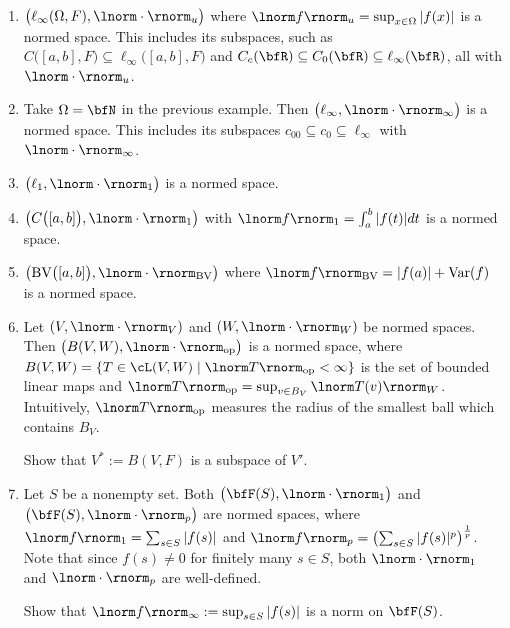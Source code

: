     \begin{center}
    \end{center}


    \begin{example}
        \phantom{a}
        \begin{enumerate}[label = (\arabic*),itemsep=1pt,topsep=3pt]
            \item $\bigl(\ell_\infty(\Omega,F), \lnorm \cdot \rnorm_u\bigr)$ where $\lnorm f \rnorm_u = \sup_{x \in \Omega}|f(x)|$ is a normed space. This includes its subspaces, such as $C \bigl([a,b],F\bigr) \subseteq \ell_\infty \bigl([a,b],F \bigr)$ and $C_c(\bfR) \subseteq C_0(\bfR) \subseteq \ell_\infty(\bfR)$, all with $\lnorm \cdot \rnorm_u$.
            \item Take $\Omega = \bfN$ in the previous example. Then $\bigl(\ell_\infty, \lnorm \cdot \rnorm_\infty\bigr)$ is a normed space. This includes its subspaces $c_{00} \subseteq c_0 \subseteq \ell_\infty$ with $\lnorm \cdot \rnorm_\infty$.
            \item $\bigl(\ell_1,\lnorm \cdot \rnorm_1\bigr)$ is a normed space.
            \item $\bigl(C\bigl([a,b]\bigr), \lnorm \cdot \rnorm_1\bigr)$ with $\lnorm f \rnorm_1 = \int_a^b |f(t)|dt$ is a normed space.
            \item $\bigl( \text{BV}\bigl([a,b]\bigr), \lnorm \cdot \rnorm_{\text{BV}}\bigr)$ where $\lnorm f \rnorm_{\text{BV}} = |f(a)| + \text{Var}(f)$ is a normed space.
            \item Let $(V,\lnorm \cdot \rnorm_V)$ and $(W,\lnorm \cdot \rnorm_W)$ be normed spaces. Then $\bigl(B(V,W),\lnorm \cdot \rnorm_\text{op}\bigr)$ is a normed space, where $B(V,W) = \{T \in \cL(V,W) \mid \lnorm T \rnorm_\text{op} < \infty\}$ is the set of bounded linear maps and $\lnorm T \rnorm_\text{op} = \sup_{v \in B_V}\lnorm T(v) \rnorm_W$. Intuitively, $\lnorm T \rnorm_\text{op}$ measures the radius of the smallest ball which contains $B_V$.
                \begin{exercise}
                    Show that $V^\ast := B(V,F)$ is a subspace of $V'$.
                \end{exercise}
            \item Let $S$ be a nonempty set. Both $\bigl( \bfF(S),\lnorm \cdot \rnorm_1\bigr)$ and $\bigl( \bfF(S),\lnorm \cdot \rnorm_p\bigr)$ are normed spaces, where $\lnorm f \rnorm_1 = \sum_{s \in S}|f(s)|$ and $\lnorm f \rnorm_p = \left( \sum_{s \in S}|f(s)|^p \right)^\frac{1}{p}$. Note that since $f(s) \neq 0$ for finitely many $s \in S$, both $\lnorm \cdot \rnorm_1$ and $\lnorm \cdot \rnorm_p$ are well-defined.
                \begin{exercise}
                    Show that $\lnorm f \rnorm_\infty := \sup_{s \in S}|f(s)|$ is a norm on $\bfF(S)$.
                \end{exercise}
        \end{enumerate}
    \end{example}
